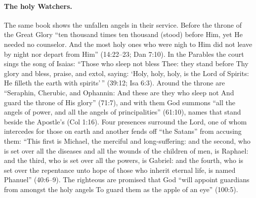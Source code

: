 \paragraph{The holy Watchers.} The same book shows the unfallen angels in
their service. Before the throne of the Great Glory ``ten thousand times ten
thousand (stood) before Him, yet He needed no counselor. And the most holy
ones who were nigh to Him did not leave by night nor depart from Him''
(14:22--23; Dan 7:10). In the Parables the court sings the song of Isaias:
``Those who sleep not bless Thee: they stand before Thy glory and bless,
praise, and extol, saying: `Holy, holy, holy, is the Lord of Spirits: He
filleth the earth with spirits'\,'' (39:12; Isa 6:3). Around the throne are
``Seraphin, Cherubic, and Ophannin: And these are they who sleep not And
guard the throne of His glory'' (71:7), and with them God summons ``all the
angels of power, and all the angels of principalities'' (61:10), names that
stand beside the Apostle's (Col 1:16). Four presences surround the Lord, one
of whom intercedes for those on earth and another fends off ``the Satans''
from accusing them: ``This first is Michael, the merciful and long-suffering:
and the second, who is set over all the diseases and all the wounds of the
children of men, is Raphael: and the third, who is set over all the powers,
is Gabriel: and the fourth, who is set over the repentance unto hope of those
who inherit eternal life, is named Phanuel'' (40:6--9). The righteous are
promised that God ``will appoint guardians from amongst the holy angels To
guard them as the apple of an eye'' (100:5).

